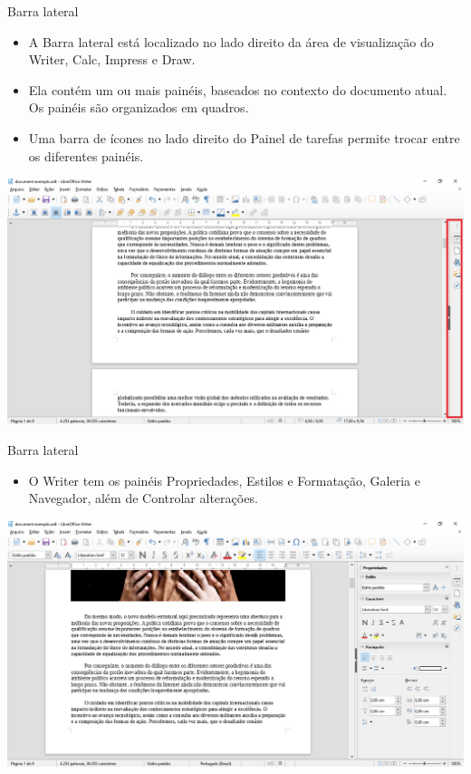 \begin{frame}{Barra lateral}
	\begin{block}{}
		\begin{itemize}
			\item A Barra lateral está localizado no lado direito da área de visualização do Writer, Calc, Impress e Draw.
			\item Ela contém um ou mais painéis, baseados no contexto do documento atual. Os painéis são organizados em quadros.
			\item Uma barra de ícones no lado direito do Painel de tarefas permite trocar entre os diferentes painéis.
		\end{itemize}
	\end{block}

	\centering
	\includegraphics[width=0.7\linewidth]{Figuras/Ch04/fig25}
\end{frame}


\begin{frame}{Barra lateral}
	\begin{block}{}
		\begin{itemize}
			\item O Writer tem os painéis Propriedades, Estilos e Formatação, Galeria e Navegador, além de Controlar alterações.
		\end{itemize}
	\end{block}

	\centering
	\includegraphics[width=0.9\linewidth]{Figuras/Ch04/fig26}
\end{frame}


